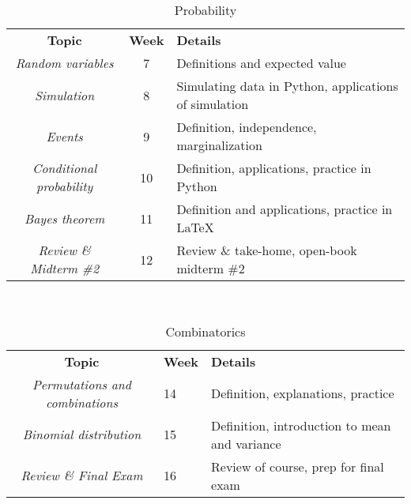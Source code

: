 \documentclass[10pt]{memoir}
\begin{document}
\begin{table}[htb!]
\centering
\begin{tabular}{ccl}
    \textbf{Topic} & \textbf{Week}  & \textbf{Details} \\
    \cmidrule[.1em](lr){1-3}
    
   \textit{Random variables} & 7 &  Definitions and expected value \\
    \cmidrule[.1em](lr){1-3}
        
   \textit{Simulation} & 8 &  Simulating data in Python, applications of simulation \\
    \cmidrule[.1em](lr){1-3}

   \textit{Events} & 9 & Definition, independence, marginalization \\
    \cmidrule[.1em](lr){1-3}

   \textit{Conditional probability} & 10 &  Definition, applications, practice in Python\\
    \cmidrule[.1em](lr){1-3} 
 
    \textit{Bayes theorem } & 11 &  Definition and applications, practice in \LaTeX \\
    \cmidrule[.1em](lr){1-3}   
 
    \textit{Review \& Midterm  \#2} & 12 & Review \& take-home, open-book midterm \#2 \\    \cmidrule[.1em](lr){1-3}     
 
\end{tabular}\\
\caption{Probability}
\end{table}

\begin{table}[htb!]
\centering
\begin{tabular}{cll}
    \textbf{Topic} & \textbf{Week}  & \textbf{Details} \\
    \cmidrule[.1em](lr){1-3}
    
   \textit{Permutations and combinations} & 14 & Definition, explanations, practice \\
    \cmidrule[.1em](lr){1-3}
        
   \textit{Binomial distribution} & 15 &  Definition, introduction to mean and variance \\
    \cmidrule[.1em](lr){1-3}
 
    \textit{Review \& Final Exam } & 16 & Review of course, prep for final exam \\  \cmidrule[.1em](lr){1-3} 
 
\end{tabular}\\
\caption{Combinatorics}
\end{table}
\end{document}
